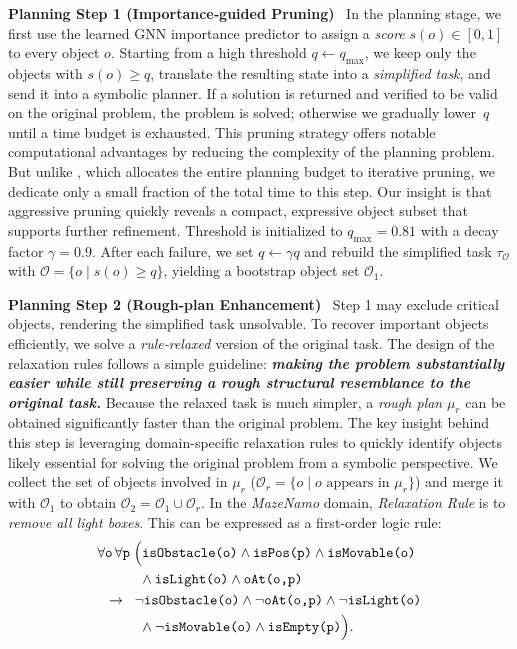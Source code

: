 \documentclass[letterpaper, 10pt, journal, twoside]{IEEEtran}
\newcommand{\myparagraph}[1]{\noindent\textbf{#1}~}
\begin{document}
\myparagraph{Planning Step 1 (Importance‑guided Pruning)}
In the planning stage, we first use the learned GNN importance predictor to assign a \emph{score} \(s(o)\!\in\![0,1]\) to every object \(o\). Starting from a high threshold \(q\!\leftarrow\! q_{\max}\), we keep only the objects with \(s(o)\ge q\), translate the resulting state into a \emph{simplified task}, and send it into a symbolic planner. If a solution is returned and verified to be valid on the original problem, the problem is solved; otherwise we gradually lower~\(q\) until a time budget is exhausted. 
This pruning strategy offers notable computational advantages by reducing the complexity of the planning problem. But unlike \cite{silver2021planning}, which allocates the entire planning budget to iterative pruning, we dedicate only a small fraction of the total time to this step. 
Our insight is that aggressive pruning quickly reveals a compact, expressive object subset that supports further refinement.
Threshold is initialized to $q_{\max}\!=\!0.81$ with a decay factor $\gamma\!=\!0.9$. After each failure, we set $q\!\leftarrow\!\gamma q$ and rebuild the simplified task $\tau_{\mathcal O}$ with $\mathcal O\!=\!\{o\!\mid \!s(o)\!\ge\!q\}$, yielding a bootstrap object set \(\mathcal O_1\).

\myparagraph{Planning Step 2 (Rough-plan Enhancement)}\;
\label{sec:step2}
Step 1 may exclude critical objects, rendering the simplified task unsolvable. To recover important objects efficiently, we solve a \emph{rule‑relaxed} version of the original task. The design of the relaxation rules follows a simple guideline: \textbf{\emph{making the problem substantially easier while still preserving a rough structural resemblance to the original task.}} Because the relaxed task is much simpler, a \emph{rough plan} \(\mu_r\) can be obtained significantly faster than the original problem. The key insight behind this step is leveraging domain-specific relaxation rules to quickly identify objects likely essential for solving the original problem from a symbolic perspective. We collect the set of objects involved in \(\mu_r\) (\(\mathcal O_r=\{o\mid o\text{ appears in }\mu_r\}\)) and merge it with \(\mathcal O_1\) to obtain \(\mathcal O_2=\mathcal O_1\cup\mathcal O_r\). In the \emph{MazeNamo} domain, \emph{Relaxation Rule} is to \emph{remove all light boxes}. This can be expressed as a first-order logic rule:
\begin{align*}\small 
& \forall \texttt{o}\,\forall \texttt{p}\;\Bigl(\texttt{isObstacle(o)}\land \texttt{isPos(p)}\land \texttt{isMovable(o)}\\
& \qquad\quad \land\texttt{isLight(o)}\land \texttt{oAt(o,p)}\\
& \;\; \rightarrow \;\;
\neg \texttt{isObstacle(o)} \land \neg \texttt{oAt(o,p)} \land \neg \texttt{isLight(o)}\\
& \qquad\quad \land \neg \texttt{isMovable(o)} \land
\texttt{isEmpty(p)}\Bigr).
\end{align*}
\end{document}
